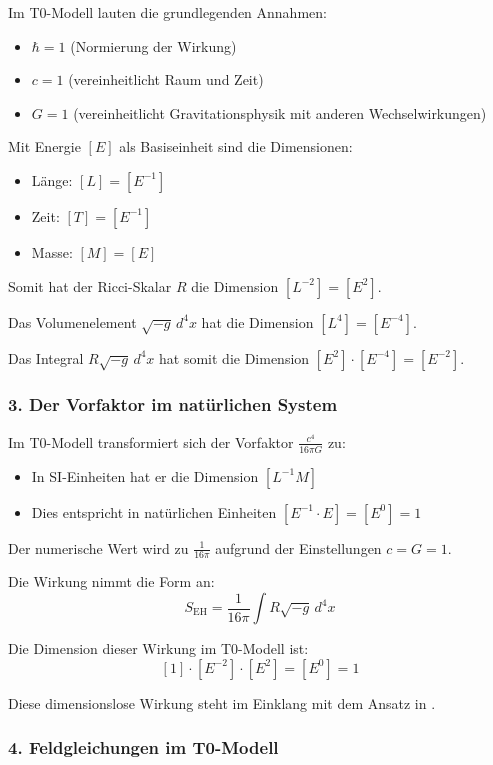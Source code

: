 \documentclass[12pt,a4paper]{article}
\begin{document}
Im T0-Modell lauten die grundlegenden Annahmen:
\begin{itemize}
	\item $\hbar = 1$ (Normierung der Wirkung)
	\item $c = 1$ (vereinheitlicht Raum und Zeit)
	\item $G = 1$ (vereinheitlicht Gravitationsphysik mit anderen Wechselwirkungen)
\end{itemize}

Mit Energie $[E]$ als Basiseinheit sind die Dimensionen:
\begin{itemize}
	\item Länge: $[L] = [E^{-1}]$
	\item Zeit: $[T] = [E^{-1}]$
	\item Masse: $[M] = [E]$
\end{itemize}

Somit hat der Ricci-Skalar $R$ die Dimension $[L^{-2}] = [E^2]$.

Das Volumenelement $\sqrt{-g} \, d^4x$ hat die Dimension $[L^4] = [E^{-4}]$.

Das Integral $R\sqrt{-g} \, d^4x$ hat somit die Dimension $[E^2] \cdot [E^{-4}] = [E^{-2}]$.

\subsubsection*{3. Der Vorfaktor im natürlichen System}

Im T0-Modell transformiert sich der Vorfaktor $\frac{c^4}{16\pi G}$ zu:
\begin{itemize}
	\item In SI-Einheiten hat er die Dimension $[L^{-1} M]$
	\item Dies entspricht in natürlichen Einheiten $[E^{-1} \cdot E] = [E^0] = 1$
\end{itemize}

Der numerische Wert wird zu $\frac{1}{16\pi}$ aufgrund der Einstellungen $c = G = 1$.

Die Wirkung nimmt die Form an:
\[
S_{\mathrm{EH}} = \frac{1}{16\pi} \int R \sqrt{-g} \, d^4x
\]

Die Dimension dieser Wirkung im T0-Modell ist:
\[
[1] \cdot [E^{-2}] \cdot [E^2] = [E^0] = 1
\]

Diese dimensionslose Wirkung steht im Einklang mit dem Ansatz in \cite{pascher_emergente_gravitation_2025}.

\subsubsection*{4. Feldgleichungen im T0-Modell}
\end{document}
